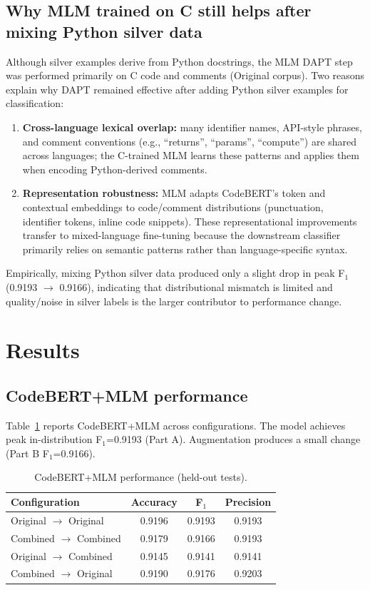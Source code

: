 \documentclass[runningheads]{ceurart}
\begin{document}
\subsection{Why MLM trained on C still helps after mixing Python silver data}
Although silver examples derive from Python docstrings, the MLM DAPT step was performed primarily on C code and comments (Original corpus). Two reasons explain why DAPT remained effective after adding Python silver examples for classification:
\begin{enumerate}
  \item \textbf{Cross-language lexical overlap:} many identifier names, API-style phrases, and comment conventions (e.g., ``returns'', ``params'', ``compute'') are shared across languages; the C-trained MLM learns these patterns and applies them when encoding Python-derived comments.
  \item \textbf{Representation robustness:} MLM adapts CodeBERT's token and contextual embeddings to code/comment distributions (punctuation, identifier tokens, inline code snippets). These representational improvements transfer to mixed-language fine-tuning because the downstream classifier primarily relies on semantic patterns rather than language-specific syntax.
\end{enumerate}
Empirically, mixing Python silver data produced only a slight drop in peak F$_1$ (0.9193 $\rightarrow$ 0.9166), indicating that distributional mismatch is limited and quality/noise in silver labels is the larger contributor to performance change.

\section{Results}
\subsection{CodeBERT+MLM performance}
Table~\ref{tab:transformer} reports CodeBERT+MLM across configurations. The model achieves peak in-distribution F$_1$=0.9193 (Part A). Augmentation produces a small change (Part B F$_1$=0.9166).

\begin{table}[h]
    \centering
    \caption{CodeBERT+MLM performance (held-out tests).}
    \label{tab:transformer}
    \small
    \begin{tabular}{lccc}
        \toprule
        Configuration & Accuracy & F$_1$ & Precision \\
        \midrule
        Original $\rightarrow$ Original & 0.9196 & 0.9193 & 0.9193 \\
        Combined $\rightarrow$ Combined & 0.9179 & 0.9166 & 0.9193 \\
        Original $\rightarrow$ Combined & 0.9145 & 0.9141 & 0.9141 \\
        Combined $\rightarrow$ Original & 0.9190 & 0.9176 & 0.9203 \\
        \bottomrule
    \end{tabular}
\end{table}
\end{document}

